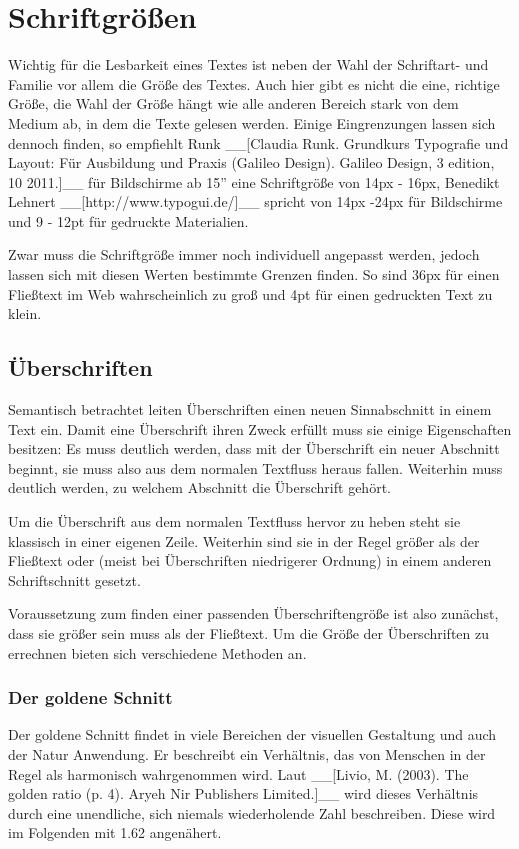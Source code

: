 \section{Schriftgrößen}
Wichtig für die Lesbarkeit eines Textes ist neben der Wahl der Schriftart- und Familie vor allem die Größe des Textes. Auch hier gibt es nicht die eine, richtige Größe, die Wahl der Größe hängt wie alle anderen Bereich stark von dem Medium ab, in dem die Texte gelesen werden.
Einige Eingrenzungen lassen sich dennoch finden, so empfiehlt Runk __[Claudia Runk. Grundkurs Typografie und Layout: Für Ausbildung und Praxis (Galileo Design). Galileo Design, 3 edition, 10 2011.]__ für Bildschirme ab 15” eine Schriftgröße von 14px - 16px, Benedikt Lehnert __[http://www.typogui.de/]__ spricht von 14px -24px für Bildschirme und 9 - 12pt für gedruckte Materialien.

Zwar muss die Schriftgröße immer noch individuell angepasst werden, jedoch lassen sich mit diesen Werten bestimmte Grenzen finden. So sind 36px für einen Fließtext im Web wahrscheinlich zu groß und 4pt für einen gedruckten Text zu klein.

\subsection{Überschriften}
Semantisch betrachtet leiten Überschriften einen neuen Sinnabschnitt in einem Text ein. Damit eine Überschrift ihren Zweck erfüllt muss sie einige Eigenschaften besitzen:
Es muss deutlich werden, dass mit der Überschrift ein neuer Abschnitt beginnt, sie muss also aus dem normalen Textfluss heraus fallen. Weiterhin muss deutlich werden, zu welchem Abschnitt die Überschrift gehört.

Um die Überschrift aus dem normalen Textfluss hervor zu heben steht sie klassisch in einer eigenen Zeile. Weiterhin sind sie in der Regel größer als der Fließtext oder (meist bei Überschriften niedrigerer Ordnung) in einem anderen Schriftschnitt gesetzt.

Voraussetzung zum finden einer passenden Überschriftengröße ist also zunächst, dass sie größer sein muss als der Fließtext. Um die Größe der Überschriften zu errechnen bieten sich verschiedene Methoden an.

\subsubsection{Der goldene Schnitt}
Der goldene Schnitt findet in viele Bereichen der visuellen Gestaltung und auch der Natur Anwendung. Er beschreibt ein Verhältnis, das von Menschen in der Regel als harmonisch wahrgenommen wird.
Laut __[Livio, M. (2003). The golden ratio (p. 4). Aryeh Nir Publishers Limited.]__ wird dieses Verhältnis durch eine unendliche, sich niemals wiederholende Zahl beschreiben. Diese wird im Folgenden mit 1.62 angenähert.


